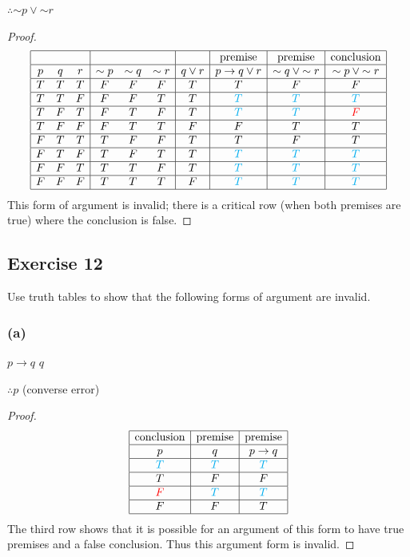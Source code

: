 \documentclass[14pt]{extarticle}
\begin{document}
$\therefore {\sim p} \vee {\sim r}$

\begin{proof} $$ \begin{array}{|ccc|ccc|c|c|c|c|} \hline
&&&&&&&\text{premise}&\text{premise}&\text{conclusion} \\ \hline p & q & r &
{\sim p} & {\sim q} & {\sim r} & q \vee r & p \to q \vee r & {\sim q} \vee {\sim
r} & {\sim p} \vee {\sim r} \\ \hline T & T & T & F & F & F & T & T & F & F \\
\hline T & T & F & F & F & T & T & \color{cyan} T & \color{cyan} T &
\color{cyan} T \\ \hline T & F & T & F & T & F & T & \color{cyan} T &
\color{cyan} T & \color{red} F \\ \hline T & F & F & F & T & T & F & F & T & T
\\ \hline F & T & T & T & F & F & T & T & F & T \\ \hline F & T & F & T & F & T
& T & \color{cyan} T & \color{cyan} T & \color{cyan} T \\ \hline F & F & T & T &
T & F & T & \color{cyan} T & \color{cyan} T & \color{cyan} T \\ \hline F & F & F
& T & T & T & F & \color{cyan} T & \color{cyan} T & \color{cyan} T \\ \hline
\end{array} $$ This form of argument is invalid; there is a critical row (when
both premises are true) where the conclusion is false. \end{proof}

\subsection{Exercise 12} Use truth tables to show that the following forms of
argument are invalid.

\subsubsection{(a)} $p \to q$
$q$

$\therefore p$ (converse error)

\begin{proof} $$ \begin{array}{|c|c|c|} \hline \text{conclusion} &
\text{premise} & \text{premise} \\ \hline p & q & p \to q \\ \hline \color{cyan}
T & \color{cyan} T & \color{cyan} T \\ \hline T & F & F \\ \hline \color{red} F
& \color{cyan} T & \color{cyan} T \\ \hline F & F & T \\ \hline \end{array} $$
The third row shows that it is possible for an argument of this form to have
true premises and a false conclusion. Thus this argument form is invalid.
\end{proof}
\end{document}
